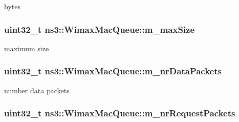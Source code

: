 bytes 

\subsubsection[{\texorpdfstring{m\+\_\+max\+Size}{m_maxSize}}]{\setlength{\rightskip}{0pt plus 5cm}uint32\+\_\+t ns3\+::\+Wimax\+Mac\+Queue\+::m\+\_\+max\+Size\hspace{0.3cm}{\ttfamily [private]}}\hypertarget{classns3_1_1WimaxMacQueue_aca04b5018ab36d96092f19467d381efd}{}\label{classns3_1_1WimaxMacQueue_aca04b5018ab36d96092f19467d381efd}


maximum size 

\subsubsection[{\texorpdfstring{m\+\_\+nr\+Data\+Packets}{m_nrDataPackets}}]{\setlength{\rightskip}{0pt plus 5cm}uint32\+\_\+t ns3\+::\+Wimax\+Mac\+Queue\+::m\+\_\+nr\+Data\+Packets\hspace{0.3cm}{\ttfamily [private]}}\hypertarget{classns3_1_1WimaxMacQueue_ac47e05e3e877edf7d7a3d2b5d20d514a}{}\label{classns3_1_1WimaxMacQueue_ac47e05e3e877edf7d7a3d2b5d20d514a}


number data packets 

\subsubsection[{\texorpdfstring{m\+\_\+nr\+Request\+Packets}{m_nrRequestPackets}}]{\setlength{\rightskip}{0pt plus 5cm}uint32\+\_\+t ns3\+::\+Wimax\+Mac\+Queue\+::m\+\_\+nr\+Request\+Packets\hspace{0.3cm}{\ttfamily [private]}}\hypertarget{classns3_1_1WimaxMacQueue_ad71c2599f50a2be15f7ce9abba5a539d}{}\label{classns3_1_1WimaxMacQueue_ad71c2599f50a2be15f7ce9abba5a539d}



